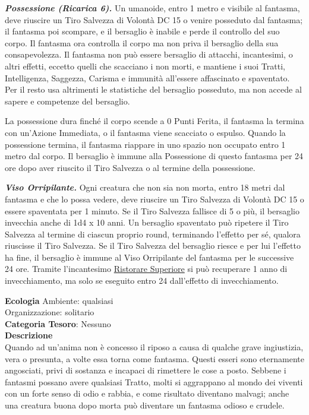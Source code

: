\begin{multicols}{2}
{\emph{\textbf{Possessione (Ricarica 6).}} Un umanoide, entro 1 metro e visibile al fantasma, deve riuscire un Tiro Salvezza di Volontà DC 15 o venire posseduto dal fantasma; il fantasma poi scompare, e il bersaglio è inabile e perde il controllo del suo corpo. Il fantasma ora controlla il corpo ma non priva il bersaglio della sua consapevolezza. Il fantasma non può essere bersaglio di attacchi, incantesimi, o altri effetti, eccetto quelli che scacciano i non morti, e mantiene i suoi Tratti, Intelligenza, Saggezza, Carisma e immunità all'essere affascinato e spaventato. Per il resto usa altrimenti le statistiche del bersaglio posseduto, ma non accede al sapere e competenze del bersaglio.

La possessione dura finché il corpo scende a 0 Punti Ferita, il fantasma la termina con un'Azione Immediata, o il fantasma viene scacciato o espulso. Quando la possessione termina, il fantasma riappare in uno spazio non occupato entro 1 metro dal corpo. Il bersaglio è immune alla Possessione di questo fantasma per 24 ore dopo aver riuscito il Tiro Salvezza o al termine della possessione.

\emph{\textbf{Viso Orripilante.}} Ogni creatura che non sia non morta, entro 18 metri dal fantasma e che lo possa vedere, deve riuscire un Tiro Salvezza di Volontà DC 15 o essere spaventata per 1 minuto. Se il Tiro Salvezza fallisce di 5 o più, il bersaglio invecchia anche di 1d4 x 10 anni. Un bersaglio spaventato può ripetere il Tiro Salvezza al termine di ciascun proprio round, terminando l'effetto per sé, qualora riuscisse il Tiro Salvezza. Se il Tiro Salvezza del bersaglio riesce e per lui l'effetto ha fine, il bersaglio è immune al Viso Orripilante del fantasma per le successive 24 ore. Tramite l'incantesimo \hyperlink{Ristorare Superiore}{Ristorare Superiore} si può recuperare 1 anno di invecchiamento, ma solo se eseguito entro 24 dall'effetto di invecchiamento.

\textbf{Ecologia}
Ambiente: qualsiasi\\
Organizzazione: solitario\\
\textbf{Categoria Tesoro}: Nessuno\\
\textbf{Descrizione}\\
Quando ad un'anima non è concesso il riposo a causa di qualche grave ingiustizia, vera o presunta, a volte essa torna come fantasma. Questi esseri sono eternamente angosciati, privi di sostanza e incapaci di rimettere le cose a posto. Sebbene i fantasmi possano avere qualsiasi Tratto, molti si aggrappano al mondo dei viventi con un forte senso di odio e rabbia, e come risultato diventano malvagi; anche una creatura buona dopo morta può diventare un fantasma odioso e crudele.

}
\end{multicols}
